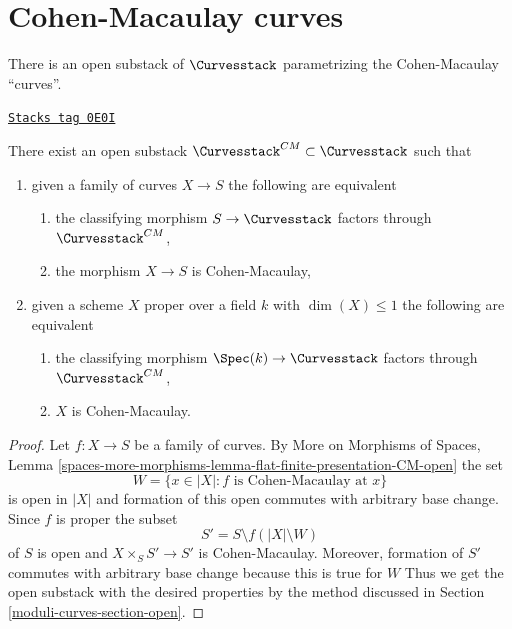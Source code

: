 \section{Cohen-Macaulay curves}
\label{moduli-curves-section-CM}
There is an open substack of $\Curvesstack$ parametrizing
the Cohen-Macaulay ``curves''.

\begin{lemma}[CM curves]
\label{moduli-curves-lemma-CM-curves}
\href{https://stacks.math.columbia.edu/tag/0E0I}{\texttt{Stacks tag 0E0I}}

There exist an open substack $\Curvesstack^{CM} \subset \Curvesstack$
such that
\begin{enumerate}
\item given a family of curves $X \to S$ the following are equivalent
\begin{enumerate}
\item the classifying morphism $S \to \Curvesstack$ factors
through $\Curvesstack^{CM}$,
\item the morphism $X \to S$ is Cohen-Macaulay,
\end{enumerate}
\item given a scheme $X$ proper over a field $k$ with $\dim(X) \leq 1$
the following are equivalent
\begin{enumerate}
\item the classifying morphism $\Spec(k) \to \Curvesstack$ factors
through $\Curvesstack^{CM}$,
\item $X$ is Cohen-Macaulay.
\end{enumerate}
\end{enumerate}
\end{lemma}

\begin{proof}
Let $f : X \to S$ be a family of curves. By
More on Morphisms of Spaces, Lemma
\ref{spaces-more-morphisms-lemma-flat-finite-presentation-CM-open}
the set
$$
W = \{x \in |X| : f \text{ is Cohen-Macaulay at }x\}
$$
is open in $|X|$ and formation of this open commutes with arbitrary
base change. Since $f$ is proper the subset
$$
S' = S \setminus f(|X| \setminus W)
$$
of $S$ is open and $X \times_S S' \to S'$ is Cohen-Macaulay.
Moreover, formation of $S'$ commutes with arbitrary base
change because this is true for $W$
Thus we get the open substack with the desired properties
by the method discussed in Section \ref{moduli-curves-section-open}.
\end{proof}

